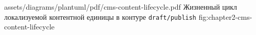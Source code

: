 \appendixdiagram
  {assets/diagrams/plantuml/pdf/cms-content-lifecycle.pdf}
  {Жизненный цикл локализуемой контентной единицы в контуре \texttt{draft/publish}}
  {fig:chapter2-cms-content-lifecycle}
